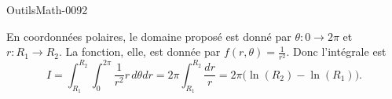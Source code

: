 
\begin{corrige}{OutilsMath-0092}

    En coordonnées polaires, le domaine proposé est donné par $\theta\colon 0\to 2\pi$ et $r\colon R_1\to R_2$. La fonction, elle, est donnée par $f(r,\theta)=\frac{1}{ r^2 }$. Donc l'intégrale est
    \begin{equation}
        I=\int_{R_1}^{R_2}\int_0^{2\pi}\frac{1}{ r^2 }r\,d\theta dr=2\pi\int_{R_1}^{R_2}\frac{ dr }{ r }=2\pi\big( \ln(R_2)-\ln(R_1) \big).
    \end{equation}

\end{corrige}
